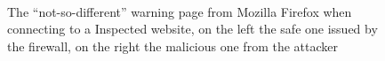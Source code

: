 \begin{figure}[!hb]
 \centering
  \\
 \vspace{0.5cm}
 \caption{The ``not-so-different'' warning page from Mozilla Firefox when connecting to a  Inspected website, on the left the safe one issued by the firewall, on the right the malicious one from the attacker}
\end{figure}

\newpage

